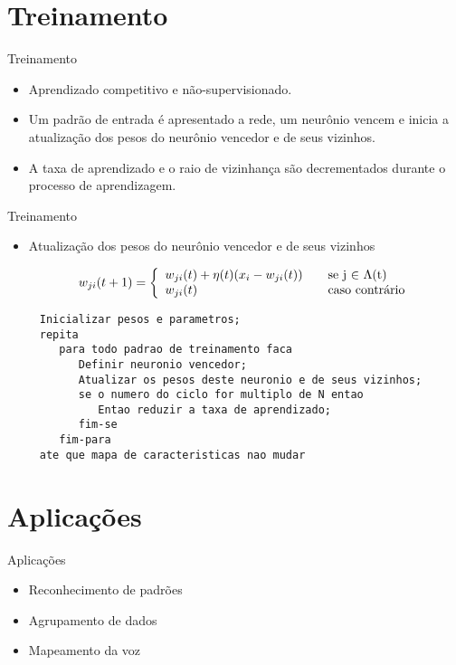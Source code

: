 \section{Treinamento}


\begin{frame}{Treinamento}
	\begin{itemize}
	  \item Aprendizado competitivo e não-supervisionado.
	  \item Um padrão de entrada é apresentado a rede, um neurônio vencem e inicia a atualização dos pesos do neurônio vencedor e de seus vizinhos.
	  \item A taxa de aprendizado e o raio de vizinhança são decrementados durante o processo de aprendizagem.
	\end{itemize}
\end{frame}


\begin{frame}{Treinamento}

	\begin{itemize}
	  \item Atualização dos pesos do neurônio vencedor e de seus vizinhos

\[ w_{ji}(t+1) = \left\{ 
  \begin{array}{l l}
    w_{ji}(t) + \eta(t)(x_{i}- w_{ji}(t)) & \quad \text{se j $\in$ $\Lambda$(t)}\\
    w_{ji}(t) & \quad \text{caso contrário}
  \end{array} \right.\]

	\end{itemize}
\end{frame}


\begin{lstlisting}
	 Inicializar pesos e parametros;
	 repita
	    para todo padrao de treinamento faca
	       Definir neuronio vencedor;
	       Atualizar os pesos deste neuronio e de seus vizinhos;
	       se o numero do ciclo for multiplo de N entao
	          Entao reduzir a taxa de aprendizado;
	       fim-se
	    fim-para
	 ate que mapa de caracteristicas nao mudar
\end{lstlisting}


\section{Aplicações}

\begin{frame}{Aplicações}
	\begin{itemize}
	  \item Reconhecimento de padrões
	  \item Agrupamento de dados
	  \item Mapeamento da voz
	\end{itemize}
\end{frame}